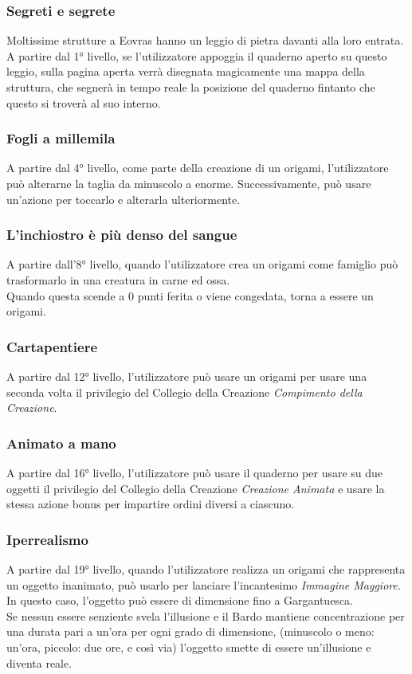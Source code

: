 \subsubsection{Segreti e segrete}
Moltissime strutture a Eovras hanno un leggio di pietra davanti alla loro entrata.\\
A partire dal 1° livello, se l'utilizzatore appoggia il quaderno aperto su questo leggio, sulla pagina aperta verrà disegnata magicamente una mappa della struttura, che segnerà in tempo reale la posizione del quaderno fintanto che questo si troverà al suo interno.

\subsubsection{Fogli a millemila}
A partire dal 4° livello, come parte della creazione di un origami, l'utilizzatore può alterarne la taglia da minuscolo a enorme. Successivamente, può usare un'azione per toccarlo e alterarla ulteriormente.

\subsubsection{L'inchiostro è più denso del sangue}
A partire dall'8° livello, quando l'utilizzatore crea un origami come famiglio può trasformarlo in una creatura in carne ed ossa.\\
Quando questa scende a 0 punti ferita o viene congedata, torna a essere un origami.

\subsubsection{Cartapentiere}
A partire dal 12° livello, l'utilizzatore può usare un origami per usare una seconda volta il privilegio del Collegio della Creazione \textit{Compimento della Creazione}.

\subsubsection{Animato a mano}
A partire dal 16° livello, l'utilizzatore può usare il quaderno per usare su due oggetti il privilegio del Collegio della Creazione \textit{Creazione Animata} e usare la stessa azione bonus per impartire ordini diversi a ciascuno.

\subsubsection{Iperrealismo}
A partire dal 19° livello, quando l'utilizzatore realizza un origami che rappresenta un oggetto inanimato, può usarlo per lanciare l'incantesimo \textit{Immagine Maggiore}. In questo caso, l'oggetto può essere di dimensione fino a Gargantuesca.\\
Se nessun essere senziente svela l'illusione e il Bardo mantiene concentrazione per una durata pari a un'ora per ogni grado di dimensione, (minuscolo o meno: un'ora, piccolo: due ore, e così via) l'oggetto smette di essere un'illusione e diventa reale.

